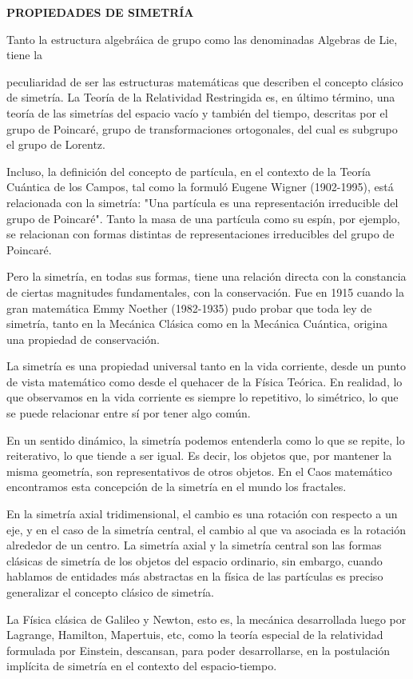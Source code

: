 \documentclass[]{article}
\begin{document}
\textbf{PROPIEDADES DE SIMETRÍA}

Tanto la estructura algebráica de grupo como las denominadas Algebras de
Lie, tiene la

peculiaridad de ser las estructuras matemáticas que describen el
concepto clásico de simetría. La Teoría de la Relatividad Restringida
es, en último término, una teoría de las simetrías del espacio vacío y
también del tiempo, descritas por el grupo de Poincaré, grupo de
transformaciones ortogonales, del cual es subgrupo el grupo de Lorentz.

Incluso, la definición del concepto de partícula, en el contexto de la
Teoría Cuántica de los Campos, tal como la formuló Eugene Wigner
(1902-1995), está relacionada con la simetría: "Una partícula es una
representación irreducible del grupo de Poincaré". Tanto la masa de una
partícula como su espín, por ejemplo, se relacionan con formas distintas
de representaciones irreducibles del grupo de Poincaré.~

Pero la simetría, en todas sus formas, tiene una relación directa con la
constancia de ciertas magnitudes fundamentales, con la conservación. Fue
en 1915 cuando la gran matemática Emmy Noether (1982-1935) pudo probar
que toda ley de simetría, tanto en la Mecánica Clásica como en la
Mecánica Cuántica, origina una propiedad de conservación.

La simetría es una propiedad universal tanto en la vida corriente, desde
un punto de vista matemático como desde el quehacer de la Física
Teórica. En realidad, lo que observamos en la vida corriente es siempre
lo repetitivo, lo simétrico, lo que se puede relacionar entre sí por
tener algo común.

En un sentido dinámico, la simetría podemos entenderla como lo que se
repite, lo reiterativo, lo que tiende a ser igual. Es decir, los objetos
que, por mantener la misma geometría, son representativos de otros
objetos. En el Caos matemático encontramos esta concepción de la
simetría en el mundo los fractales.

En la simetría axial tridimensional, el cambio es una rotación con
respecto a un eje, y en el caso de la simetría central, el cambio al que
va asociada es la rotación alrededor de un centro. La simetría axial y
la simetría central son las formas clásicas de simetría de los objetos
del espacio ordinario, sin embargo, cuando hablamos de entidades más
abstractas en la física de las partículas es preciso generalizar el
concepto clásico de simetría.~

La Física clásica de Galileo y Newton, esto es, la mecánica desarrollada
luego por Lagrange, Hamilton, Mapertuis, etc, como la teoría especial de
la relatividad formulada por Einstein, descansan, para poder
desarrollarse, en la postulación implícita de simetría en el contexto
del espacio-tiempo.
\end{document}
